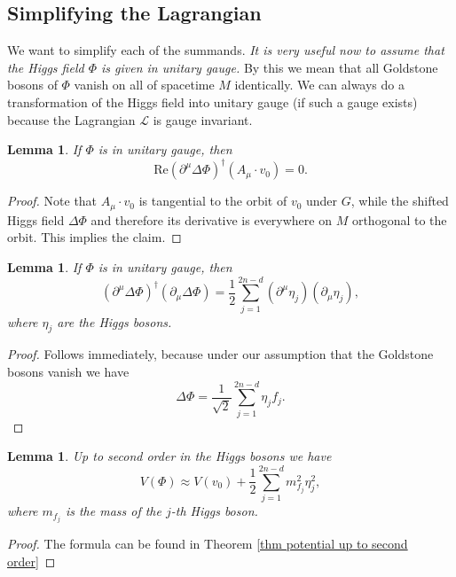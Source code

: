 \documentclass[12pt]{amsart}
\newtheorem{lem}[thm]{Lemma}
\theoremstyle{definition}
\theoremstyle{remark}
\numberwithin{equation}{section}
\begin{document}
\subsection{Simplifying the Lagrangian}
We want to simplify each of the summands. {\em It is very useful now to assume that the Higgs field $\Phi$ is given in unitary gauge.} By this we mean that all Goldstone bosons of $\Phi$ vanish on all of spacetime $M$ identically. We can always do a transformation of the Higgs field into unitary gauge (if such a gauge exists) because the Lagrangian $\mathcal{L}$ is gauge invariant.
\begin{lem}If $\Phi$ is in unitary gauge, then 
\begin{equation*}
\mathrm{Re}\left(\partial^\mu\Delta\Phi\right)^\dagger\left(A_\mu\cdot v_0\right)=0.
\end{equation*}
\end{lem}
\begin{proof}Note that $A_\mu\cdot v_0$ is tangential to the orbit of $v_0$ under $G$, while the shifted Higgs field $\Delta\Phi$ and therefore its derivative is everywhere on $M$ orthogonal to the orbit. This implies the claim.
\end{proof}
\begin{lem}If $\Phi$ is in unitary gauge, then 
\begin{equation*}
\left(\partial^\mu\Delta\Phi\right)^\dagger\left(\partial_\mu\Delta\Phi\right)=\frac{1}{2}\sum_{j=1}^{2n-d}\left(\partial^\mu\eta_j\right)\left(\partial_\mu\eta_j\right),
\end{equation*}
where $\eta_j$ are the Higgs bosons.
\end{lem}
\begin{proof}
Follows immediately, because under our assumption that the Goldstone bosons vanish we have 
\begin{equation*}
\Delta\Phi=\frac{1}{\sqrt{2}}\sum_{j=1}^{2n-d}\eta_jf_j.
\end{equation*}
\end{proof}
\begin{lem}Up to second order in the Higgs bosons we have 
\begin{equation*}
V(\Phi)\approx V(v_0)+\frac{1}{2}\sum_{j=1}^{2n-d}m_{f_j}^2\eta_j^2,
\end{equation*}
where $m_{f_j}$ is the mass of the $j$-th Higgs boson.
\end{lem}
\begin{proof}
The formula can be found in Theorem \ref{thm potential up to second order}
\end{proof}
\end{document}
